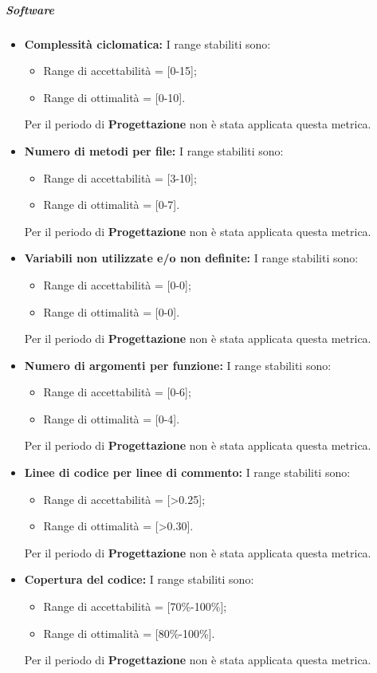 \subparagraph{Software}
\begin{itemize}
\item \textbf{Complessità ciclomatica: }I range stabiliti sono:
      \begin{itemize}
        \item Range di accettabilità = [0-15];
        \item Range di ottimalità = [0-10].
      \end{itemize}
Per il periodo di \textbf{Progettazione} non è stata applicata questa metrica.

\item \textbf{Numero di metodi per file: }I range stabiliti sono:
      \begin{itemize}
        \item Range di accettabilità = [3-10];
        \item Range di ottimalità = [0-7].
      \end{itemize}
Per il periodo di \textbf{Progettazione} non è stata applicata questa metrica.

\item \textbf{Variabili non utilizzate e/o non definite: }I range stabiliti sono:
      \begin{itemize}
        \item Range di accettabilità = [0-0];
        \item Range di ottimalità = [0-0].
      \end{itemize}
Per il periodo di \textbf{Progettazione} non è stata applicata questa metrica.

\item \textbf{Numero di argomenti per funzione: }I range stabiliti sono:
      \begin{itemize}
        \item Range di accettabilità = [0-6];
        \item Range di ottimalità = [0-4].
      \end{itemize}
Per il periodo di \textbf{Progettazione} non è stata applicata questa metrica.

\item \textbf{Linee di codice per linee di commento: } I range stabiliti sono:
      \begin{itemize}
        \item Range di accettabilità = [>0.25];
        \item Range di ottimalità = [>0.30].
      \end{itemize}
Per il periodo di \textbf{Progettazione} non è stata applicata questa metrica.
\end{itemize}

\begin{itemize}
\item \textbf{Copertura del codice: }I range stabiliti sono:
      \begin{itemize}
        \item Range di accettabilità = [70\%-100\%];
        \item Range di ottimalità = [80\%-100\%].
      \end{itemize}
Per il periodo di \textbf{Progettazione} non è stata applicata questa metrica.

\end{itemize} 